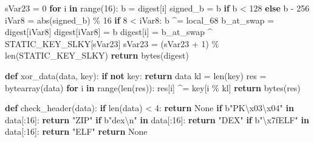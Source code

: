 \documentclass[
]{article}
\newenvironment{Shaded}{}{}
\newcommand{\BuiltInTok}[1]{\textcolor[rgb]{0.00,0.50,0.00}{#1}}
\newcommand{\CharTok}[1]{\textcolor[rgb]{0.25,0.44,0.63}{#1}}
\newcommand{\ControlFlowTok}[1]{\textcolor[rgb]{0.00,0.44,0.13}{\textbf{#1}}}
\newcommand{\DecValTok}[1]{\textcolor[rgb]{0.25,0.63,0.44}{#1}}
\newcommand{\KeywordTok}[1]{\textcolor[rgb]{0.00,0.44,0.13}{\textbf{#1}}}
\newcommand{\NormalTok}[1]{#1}
\newcommand{\OperatorTok}[1]{\textcolor[rgb]{0.40,0.40,0.40}{#1}}
\newcommand{\StringTok}[1]{\textcolor[rgb]{0.25,0.44,0.63}{#1}}
\newcommand{\VariableTok}[1]{\textcolor[rgb]{0.10,0.09,0.49}{#1}}
\begin{document}
\begin{Shaded}
\begin{Highlighting}[]
\NormalTok{    sVar23 }\OperatorTok{=} \DecValTok{0}
    \ControlFlowTok{for}\NormalTok{ i }\KeywordTok{in} \BuiltInTok{range}\NormalTok{(}\DecValTok{16}\NormalTok{):}
\NormalTok{        b }\OperatorTok{=}\NormalTok{ digest[i]}
\NormalTok{        signed\_b }\OperatorTok{=}\NormalTok{ b }\ControlFlowTok{if}\NormalTok{ b }\OperatorTok{\textless{}} \DecValTok{128} \ControlFlowTok{else}\NormalTok{ b }\OperatorTok{{-}} \DecValTok{256}
\NormalTok{        iVar8 }\OperatorTok{=} \BuiltInTok{abs}\NormalTok{(signed\_b) }\OperatorTok{\%} \DecValTok{16}
        \ControlFlowTok{if} \DecValTok{8} \OperatorTok{\textless{}}\NormalTok{ iVar8:}
\NormalTok{            b }\OperatorTok{\^{}=}\NormalTok{ local\_68}
\NormalTok{        b\_at\_swap }\OperatorTok{=}\NormalTok{ digest[iVar8]}
\NormalTok{        digest[iVar8] }\OperatorTok{=}\NormalTok{ b}
\NormalTok{        digest[i] }\OperatorTok{=}\NormalTok{ b\_at\_swap }\OperatorTok{\^{}}\NormalTok{ STATIC\_KEY\_SLKY[sVar23]}
\NormalTok{        sVar23 }\OperatorTok{=}\NormalTok{ (sVar23 }\OperatorTok{+} \DecValTok{1}\NormalTok{) }\OperatorTok{\%} \BuiltInTok{len}\NormalTok{(STATIC\_KEY\_SLKY)}
    \ControlFlowTok{return} \BuiltInTok{bytes}\NormalTok{(digest)}

\KeywordTok{def}\NormalTok{ xor\_data(data, key):}
    \ControlFlowTok{if} \KeywordTok{not}\NormalTok{ key: }\ControlFlowTok{return}\NormalTok{ data}
\NormalTok{    kl }\OperatorTok{=} \BuiltInTok{len}\NormalTok{(key)}
\NormalTok{    res }\OperatorTok{=} \BuiltInTok{bytearray}\NormalTok{(data)}
    \ControlFlowTok{for}\NormalTok{ i }\KeywordTok{in} \BuiltInTok{range}\NormalTok{(}\BuiltInTok{len}\NormalTok{(res)):}
\NormalTok{        res[i] }\OperatorTok{\^{}=}\NormalTok{ key[i }\OperatorTok{\%}\NormalTok{ kl]}
    \ControlFlowTok{return} \BuiltInTok{bytes}\NormalTok{(res)}

\KeywordTok{def}\NormalTok{ check\_header(data):}
    \ControlFlowTok{if} \BuiltInTok{len}\NormalTok{(data) }\OperatorTok{\textless{}} \DecValTok{4}\NormalTok{: }\ControlFlowTok{return} \VariableTok{None}
    \ControlFlowTok{if} \StringTok{b"PK}\CharTok{\textbackslash{}x03\textbackslash{}x04}\StringTok{"} \KeywordTok{in}\NormalTok{ data[:}\DecValTok{16}\NormalTok{]: }\ControlFlowTok{return} \StringTok{"ZIP"}
    \ControlFlowTok{if} \StringTok{b"dex}\CharTok{\textbackslash{}n}\StringTok{"} \KeywordTok{in}\NormalTok{ data[:}\DecValTok{16}\NormalTok{]: }\ControlFlowTok{return} \StringTok{"DEX"}
    \ControlFlowTok{if} \StringTok{b"}\CharTok{\textbackslash{}x7f}\StringTok{ELF"} \KeywordTok{in}\NormalTok{ data[:}\DecValTok{16}\NormalTok{]: }\ControlFlowTok{return} \StringTok{"ELF"}
    \ControlFlowTok{return} \VariableTok{None}


\end{Highlighting}
\end{Shaded}
\end{document}
